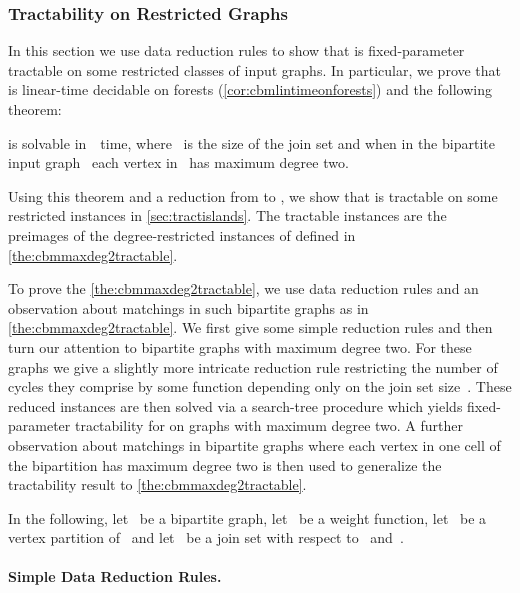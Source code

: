 \subsubsection{Tractability on Restricted Graphs}

In this section we use data reduction rules to show that \pCBMs{} is fixed-parameter tractable on some restricted classes of input graphs. In particular, we prove that \pCBMs{} is linear-time decidable on forests (\autoref{cor:cbmlintimeonforests}) and the following theorem:
\begin{theorem}\label{the:cbmmaxdeg2tractable}
  \pCBM{} is solvable in~~time, where~ is the size of the join set and when in the bipartite input graph~ each vertex in~ has maximum degree two.
\end{theorem}
Using this theorem and a reduction from \pWMEE{} to \pCBMs{}, we show that \pWMEE{} is tractable on some restricted instances in \autoref{sec:tractislands}. The tractable instances are the preimages of the degree-restricted instances of \pCBMs{} defined in \autoref{the:cbmmaxdeg2tractable}.

To prove the \autoref{the:cbmmaxdeg2tractable}, we use data reduction rules and an observation about matchings in such bipartite graphs as in \autoref{the:cbmmaxdeg2tractable}. We first give some simple reduction rules and then turn our attention to bipartite graphs with maximum degree two. For these graphs we give a slightly more intricate reduction rule restricting the number of cycles they comprise by some function depending only on the join set size~. These reduced instances are then solved via a search-tree procedure which yields fixed-parameter tractability for \pCBMs{} on graphs with maximum degree two. A further observation about matchings in bipartite graphs where each vertex in one cell of the bipartition has maximum degree two is then used to generalize the tractability result to \autoref{the:cbmmaxdeg2tractable}.

In the following, let~ be a bipartite graph, let~ be a weight function, let~ be a vertex partition of~ and let~ be a join set with respect to~ and~.

\paragraph{Simple Data Reduction Rules.}


